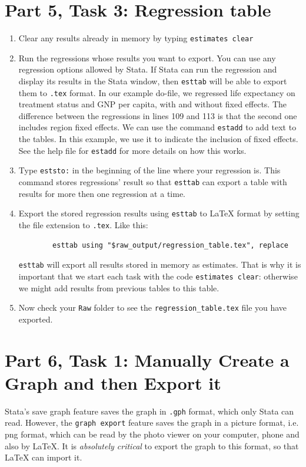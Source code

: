 \documentclass[]{article}
\begin{document}
\section*{Part 5, Task 3: Regression table}

\begin{enumerate}
	\item Clear any results already in memory by typing \texttt{estimates clear}
	\item Run the regressions whose results you want to export. You can use any regression options allowed by Stata. If Stata can run the regression and display its results in the Stata window, then \texttt{esttab} will be able to export them to \texttt{.tex} format. In our example do-file, we regressed life expectancy on treatment status and GNP per capita, with and without fixed effects. The difference between the regressions in lines 109 and 113 is that the second one includes region fixed effects. We can use the command \texttt{estadd} to add text to the tables. In this example, we use it to indicate the inclusion of fixed effects. See the help file for \texttt{estadd} for more details on how this works.
	\item Type \texttt{eststo:} in the beginning of the line where your regression is. This command stores regressions' result so that \texttt{esttab} can export a table with results for more then one regression at a time.
	\item Export the stored regression results using \texttt{esttab} to {\LaTeX} format by setting the file extension to \texttt{.tex}. Like this: 
	\begin{Verbatim}
		esttab using "$raw_output/regression_table.tex", replace
	\end{Verbatim}
	
	\texttt{esttab} will export all results stored in memory as estimates. That is why it is important that we start each task with the code \texttt{estimates 	clear}: otherwise we might add results from previous tables to this table.
	\item Now check your \texttt{Raw} folder to see the \texttt{regression\_table.tex} file you have exported.
\end{enumerate}

 
\section*{Part 6, Task 1: Manually Create a Graph and then Export it}

 Stata's save graph feature saves the graph in \texttt{.gph} format, which only Stata can read. However, the \texttt{graph export} feature  saves the graph in a picture format, i.e. png format, which can be read by the photo viewer on your computer, phone and also by {\LaTeX}. It is \emph{absolutely critical} to export the graph to this format, so that {\LaTeX} can import it.
\end{document}
